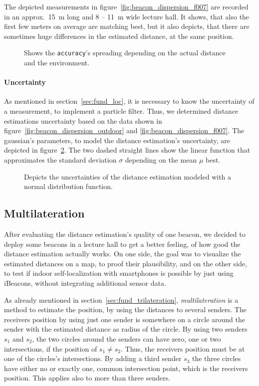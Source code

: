 The depicted measurements in figure~\ref{fig:beacon_dispersion_f007} are recorded in an approx.\ 15~m long and 8 -- 11~m wide lecture hall. It shows, that also the first few meters on average are matching best, but it also depicts, that there are sometimes huge differences in the estimated distance, at the same position.

\begin{figure}
	
	\caption {Shows the \texttt{accuracy}'s spreading depending on the actual distance and the environment.}
	\label{fig:beacon_dispersion}
\end{figure}


\paragraph{Uncertainty} As mentioned in section~\ref{sec:fund_loc}, it is necessary to know the uncertainty of a measurement, to implement a particle filter. Thus, we determined distance estimations uncertainty based on the data shown in figure~\ref{fig:beacon_dispersion_outdoor} and \ref{fig:beacon_dispersion_f007}. The gaussian's parameters, to model the distance estimation's uncertainty, are depicted in figure~\ref{fig:beacon_eval_ndf}. The two dashed straight lines show the linear function that approximates the standard deviation $\sigma$ depending on the mean $\mu$ best.

\begin{figure}
	
	\caption{Depicts the uncertainties of the distance estimation modeled with a normal distribution function.}
	\label{fig:beacon_eval_ndf}
\end{figure}


\subsection{Multilateration}
After evaluating the distance estimation's quality of one beacon, we decided to deploy some beacons in a lecture hall to get a better feeling, of how good the distance estimation actually works. On one side, the goal was to visualize the estimated distances on a map, to proof their plausibility, and on the other side, to test if indoor self-localization with smartphones is possible by just using iBeacons, without integrating additional sensor data.

As already mentioned in section~\ref{sec:fund_trilateration}, \emph{multilateration} is a method to estimate the position, by using the distances to several senders. The receivers position by using just one sender is somewhere on a circle around the sender with the estimated distance as radius of the circle.
By using two senders $s_1$ and $s_2$, the two circles around the senders can have zero, one or two intersections, if the position of $s_1 \neq s_2$. Thus, the receivers position must be at one of the circles's intersections.
By adding a third sender $s_3$ the three circles have either no or exactly one, common intersection point, which is the receivers position. This applies also to more than three senders.

